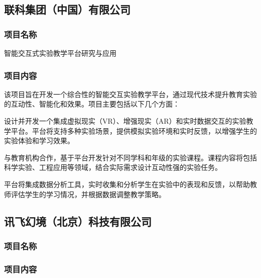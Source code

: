 \subsection{联科集团（中国）有限公司}


\subsubsection{项目名称}

智能交互式实验教学平台研究与应用

\subsubsection{项目内容}

该项目旨在开发一个综合性的智能交互实验教学平台，通过现代技术提升教育实验的互动性、智能化和效果。项目主要包括以下几个方面：



设计并开发一个集成虚拟现实（VR）、增强现实（AR）和实时数据交互的实验教学平台。平台将支持多种实验场景，提供模拟实验环境和实时反馈，以增强学生的实验体验和学习效果。



与教育机构合作，基于平台开发针对不同学科和年级的实验课程。课程内容将包括科学实验、工程应用等领域，结合实际需求设计互动性强的实验任务。



平台将集成数据分析工具，实时收集和分析学生在实验中的表现和反馈，以帮助教师评估学生的学习情况，并根据数据调整教学策略。

\subsection{讯飞幻境（北京）科技有限公司}

\subsubsection{项目名称}






\subsubsection{项目内容}

